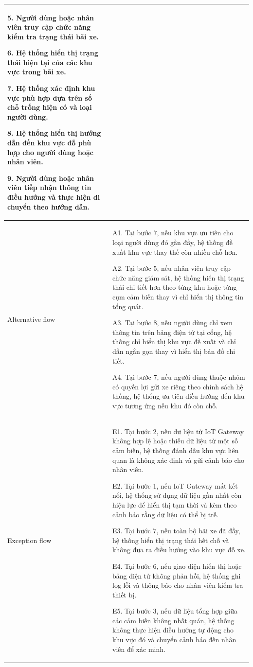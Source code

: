 \begin{center}
\begin{longtable}{|m{2.5cm}|m{13cm}|}
5. Người dùng hoặc nhân viên truy cập chức năng kiểm tra trạng thái bãi xe.

6. Hệ thống hiển thị trạng thái hiện tại của các khu vực trong bãi xe.

7. Hệ thống xác định khu vực phù hợp dựa trên số chỗ trống hiện có và loại người dùng.

8. Hệ thống hiển thị hướng dẫn đến khu vực đỗ phù hợp cho người dùng hoặc nhân viên.

9. Người dùng hoặc nhân viên tiếp nhận thông tin điều hướng và thực hiện di chuyển theo hướng dẫn.\\
\hline
Alternative flow & 
A1. Tại bước 7, nếu khu vực ưu tiên cho loại người dùng đó gần đầy, hệ thống đề xuất khu vực thay thế còn nhiều chỗ hơn.

A2. Tại bước 5, nếu nhân viên truy cập chức năng giám sát, hệ thống hiển thị trạng thái chi tiết hơn theo từng khu hoặc từng cụm cảm biến thay vì chỉ hiển thị thông tin tổng quát.

A3. Tại bước 8, nếu người dùng chỉ xem thông tin trên bảng điện tử tại cổng, hệ thống chỉ hiển thị khu vực đề xuất và chỉ dẫn ngắn gọn thay vì hiển thị bản đồ chi tiết.

A4. Tại bước 7, nếu người dùng thuộc nhóm có quyền lợi gửi xe riêng theo chính sách hệ thống, hệ thống ưu tiên điều hướng đến khu vực tương ứng nếu khu đó còn chỗ.\\ 
\hline
Exception flow & 
E1. Tại bước 2, nếu dữ liệu từ IoT Gateway không hợp lệ hoặc thiếu dữ liệu từ một số cảm biến, hệ thống đánh dấu khu vực liên quan là không xác định và gửi cảnh báo cho nhân viên.

E2. Tại bước 1, nếu IoT Gateway mất kết nối, hệ thống sử dụng dữ liệu gần nhất còn hiệu lực để hiển thị tạm thời và kèm theo cảnh báo rằng dữ liệu có thể bị trễ.

E3. Tại bước 7, nếu toàn bộ bãi xe đã đầy, hệ thống hiển thị trạng thái hết chỗ và không đưa ra điều hướng vào khu vực đỗ xe.

E4. Tại bước 6, nếu giao diện hiển thị hoặc bảng điện tử không phản hồi, hệ thống ghi log lỗi và thông báo cho nhân viên kiểm tra thiết bị.

E5. Tại bước 3, nếu dữ liệu tổng hợp giữa các cảm biến không nhất quán, hệ thống không thực hiện điều hướng tự động cho khu vực đó và chuyển cảnh báo đến nhân viên để xác minh.\\
\hline
\end{longtable}
\end{center}
